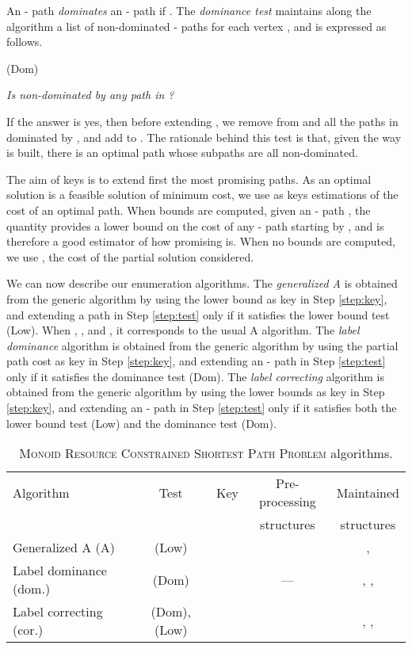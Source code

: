 \documentclass[11pt]{amsart}
\theoremstyle{plain}
\theoremstyle{remark}
\newcommand{\MRCSP}{\textsc{Monoid Resource Constrained Shortest Path Problem}\xspace}
\begin{document}
An - path  \emph{dominates} an - path  if  . The \emph{dominance test} maintains along the algorithm a list  of non-dominated - paths for each vertex , and is expressed as follows.

\smallskip
	(Dom) \begin{minipage}{\dimexpr\textwidth-2cm} \emph{Is  non-dominated by any path in ?}
\end{minipage}
\smallskip

\noindent 
If the answer is yes, then before extending , we remove from  and  all the paths in  dominated by , and add  to . 
The rationale behind this test is that, given the way  is built, there is an optimal path whose subpaths are all non-dominated.

The aim of keys is to extend first the most promising paths. As an optimal solution is a feasible solution of minimum cost, we use as keys estimations of the cost of an optimal path. When bounds  are computed, given an - path , the quantity  provides a lower bound on the cost of any - path starting by , and is therefore a good estimator of how promising  is. When no bounds are computed, we use , the cost of the partial solution considered.

We can now describe our enumeration algorithms.  The \emph{generalized A} is obtained from the generic algorithm by using the lower bound  as key in Step \ref{step:key}, and extending a path  in Step \ref{step:test} only if it satisfies the lower bound test (Low). When , , and , it corresponds to the usual A algorithm. The \emph{label dominance} algorithm is obtained from the generic algorithm by using the partial path cost  as key in Step \ref{step:key}, and extending an - path  in Step \ref{step:test} only if it satisfies the dominance test (Dom). The \emph{label correcting} algorithm is obtained from the generic algorithm by using the lower bounds  as key in Step \ref{step:key}, and extending an - path  in Step \ref{step:test} only if it satisfies both the lower bound test (Low) and the dominance test (Dom).

\begin{table}
	\begin{tabular}{p{4.2cm}cccc}
	\hline
	Algorithm & Test & Key & Pre-processing & Maintained \\
	&&& structures & structures \\
	\hline
	Generalized A (A) & (Low) &  &  & ,  \\
	Label dominance (dom.) & (Dom) & & --- & , , \\
Label correcting (cor.) & (Dom), (Low) & &  & , , \\
	\hline
	\end{tabular}
	\caption{\MRCSP algorithms.}
	\label{tab:mrcspAlgo}
\end{table}
\end{document}
